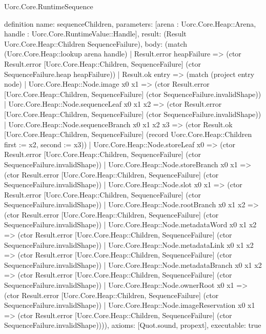 \begin{lexlean}{Uorc.Core.RuntimeSequence}
\begin{semanticmodule}
definition{
  name: sequenceChildren,
  parameters: [arena : Uorc.Core.Heap::Arena, handle : Uorc.Core.RuntimeValue::Handle],
  result: (Result Uorc.Core.Heap::Children SequenceFailure),
  body: (match (Uorc.Core.Heap::lookup arena handle)
    | Result.error heapFailure => (ctor Result.error [Uorc.Core.Heap::Children, SequenceFailure] (ctor SequenceFailure.heap heapFailure))
    | Result.ok entry => (match (project entry node)
      | Uorc.Core.Heap::Node.image x0 x1 => (ctor Result.error [Uorc.Core.Heap::Children, SequenceFailure] (ctor SequenceFailure.invalidShape))
      | Uorc.Core.Heap::Node.sequenceLeaf x0 x1 x2 => (ctor Result.error [Uorc.Core.Heap::Children, SequenceFailure] (ctor SequenceFailure.invalidShape))
      | Uorc.Core.Heap::Node.sequenceBranch x0 x1 x2 x3 => (ctor Result.ok [Uorc.Core.Heap::Children, SequenceFailure] (record Uorc.Core.Heap::Children {first := x2, second := x3}))
      | Uorc.Core.Heap::Node.storeLeaf x0 => (ctor Result.error [Uorc.Core.Heap::Children, SequenceFailure] (ctor SequenceFailure.invalidShape))
      | Uorc.Core.Heap::Node.storeBranch x0 x1 => (ctor Result.error [Uorc.Core.Heap::Children, SequenceFailure] (ctor SequenceFailure.invalidShape))
      | Uorc.Core.Heap::Node.slot x0 x1 => (ctor Result.error [Uorc.Core.Heap::Children, SequenceFailure] (ctor SequenceFailure.invalidShape))
      | Uorc.Core.Heap::Node.rootBranch x0 x1 x2 => (ctor Result.error [Uorc.Core.Heap::Children, SequenceFailure] (ctor SequenceFailure.invalidShape))
      | Uorc.Core.Heap::Node.metadataWord x0 x1 x2 => (ctor Result.error [Uorc.Core.Heap::Children, SequenceFailure] (ctor SequenceFailure.invalidShape))
      | Uorc.Core.Heap::Node.metadataLink x0 x1 x2 => (ctor Result.error [Uorc.Core.Heap::Children, SequenceFailure] (ctor SequenceFailure.invalidShape))
      | Uorc.Core.Heap::Node.metadataBranch x0 x1 x2 => (ctor Result.error [Uorc.Core.Heap::Children, SequenceFailure] (ctor SequenceFailure.invalidShape))
      | Uorc.Core.Heap::Node.ownerRoot x0 x1 => (ctor Result.error [Uorc.Core.Heap::Children, SequenceFailure] (ctor SequenceFailure.invalidShape))
      | Uorc.Core.Heap::Node.imageReservation x0 x1 => (ctor Result.error [Uorc.Core.Heap::Children, SequenceFailure] (ctor SequenceFailure.invalidShape)))),
  axioms: [Quot.sound, propext],
  executable: true
}


\end{semanticmodule}
\end{lexlean}
